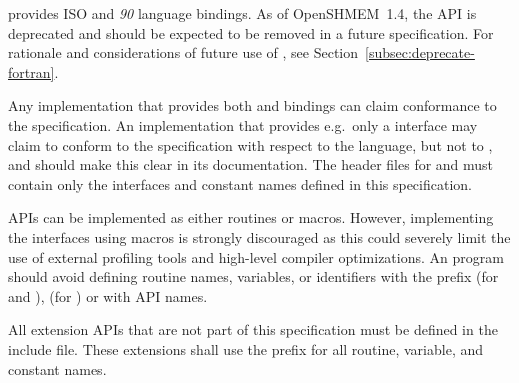 \openshmem provides ISO \Clang{} and \Fortran{} \textit{90} language bindings.
As of OpenSHMEM~1.4, the \Fortran{} API is deprecated and should be expected
to be removed in a future specification. For rationale and considerations of
future \Fortran{} use of \openshmem, see Section~\ref{subsec:deprecate-fortran}.

Any implementation that provides both \Clang{} and \Fortran{} bindings can claim
conformance to the specification. An implementation that provides e.g.\ only a
\Clang{} interface may claim to conform to the \openshmem specification with
respect to the \Clang{} language, but not to \Fortran, and should make this
clear in its documentation. The \openshmem header files for \Clang{} and
\Fortran{} must contain only the interfaces and constant names defined in this
specification.

\openshmem \ac{API}s can be implemented as either routines or macros. However,
implementing the interfaces using macros is strongly discouraged as this could
severely limit the use of external profiling tools and high-level compiler
optimizations. An \openshmem program should avoid defining routine names,
variables, or identifiers with the prefix \shmemprefix (for \Clang{} and
\Fortran), \shmemprefixC (for \Clang) or with \openshmem \ac{API} names.

All \openshmem extension \ac{API}s that are not part of this specification must
be defined in the  include file. These extensions shall use the
 prefix for all routine, variable, and constant names.
